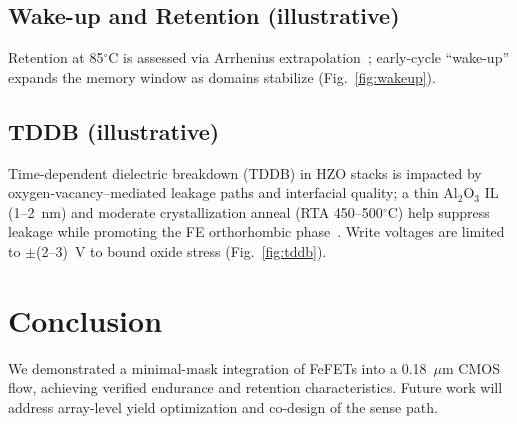 \documentclass[conference]{IEEEtran}
\begin{document}
\subsection{Wake-up and Retention (illustrative)}
Retention at 85$^\circ$C is assessed via Arrhenius extrapolation~\cite{Yamazaki2018}; early-cycle “wake-up” expands the memory window as domains stabilize (Fig.~\ref{fig:wakeup}).

\subsection{TDDB (illustrative)}
Time-dependent dielectric breakdown (TDDB) in HZO stacks is impacted by oxygen-vacancy–mediated leakage paths and interfacial quality; a thin Al$_2$O$_3$ IL (1--2~nm) and moderate crystallization anneal (RTA 450--500$^\circ$C) help suppress leakage while promoting the FE orthorhombic phase~\cite{Mueller2015,Park2020}. Write voltages are limited to $\pm$(2--3)~V to bound oxide stress (Fig.~\ref{fig:tddb}).

\section{Conclusion}
We demonstrated a minimal-mask integration of FeFETs into a 0.18~$\mu$m CMOS flow, achieving verified endurance and retention characteristics. Future work will address array-level yield optimization and co-design of the sense path.
\end{document}
